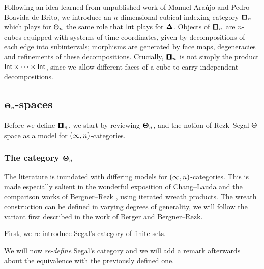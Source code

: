 Following an idea learned from unpublished work of Manuel Araújo and Pedro Boavida de Brito, we introduce an \(n\)-dimensional cubical indexing category \(\cube_n\) which plays for \(\operatorname{\boldsymbol{\Theta}}_n\) the same role that \(\operatorname{\mathsf{Int}}\) plays for \(\mathbf\Delta\). Objects of \(\cube_n\) are \(n\)-cubes equipped with systems of time coordinates, given by decompositions of each edge into subintervals; morphisms are generated by face maps, degeneracies and refinements of these decompositions. Crucially, \(\cube_n\) is not simply the product \(\operatorname{\mathsf{Int}} \times \cdots \times \operatorname{\mathsf{Int}}\), since we allow different faces of a cube to carry independent decompositions.


\subsection{\texorpdfstring{$\mathbf\Theta_n$}{Theta_n}-spaces}

Before we define $\cube_n$, we start by reviewing $\mathbf\Theta_n$, and the notion of Rezk--Segal $\operatorname{\boldsymbol{\Theta}}$-space as a model for $(\operatorname{\infty},n)$-categories.

\subsubsection{The category \texorpdfstring{$\mathbf\Theta_n$}{Theta_n}}

The literature is inundated with differing models for $(\operatorname{\infty},n)$-categories. This is made especially salient in the wonderful exposition of Chang--Lauda \cite{CL04} and the comparison works of Bergner--Rezk \cite{BR13,BR14}, using iterated wreath products. The wreath construction can be defined in varying degrees of generality, we will follow the variant first described in the work of Berger \cite{BER05} and Bergner--Rezk.

First, we re-introduce Segal's category of finite sets.

\begin{warning}
We will now \emph{re-define} Segal's category and we will add a remark afterwards about the equivalence with the previously defined one.
\end{warning}

